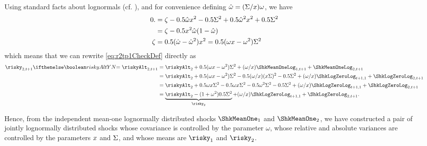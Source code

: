 Using standard facts about lognormals (cf. \MathFactsList), and for convenience
defining $\hat{\omega}= (\Sigma/x) \omega$, we have
\begin{equation}\begin{gathered}\begin{aligned}
  0. & =  \zeta - 0.5 \hat{\omega} x^{2} - 0.5 \Sigma^{2} + 0.5\hat{\omega}^{2}x^{2}+0.5  \Sigma^{2}
\\ & =  \zeta -0.5 x^{2} \hat{\omega}(1-\hat{\omega})
\\ \zeta & =  0.5 (\hat{\omega}-\hat{\omega}^{2}) x^{2} = 0.5 (\omega x-\omega^{2}) \Sigma^{2}
\end{aligned}\end{gathered}\end{equation}
which means that we can rewrite \eqref{eq:r2tp1CheckDef} directly as
\begin{equation*}\begin{gathered}\begin{aligned}
   \risky_{2,t+1} \ifriskyAlt{= \riskyAlt_{2,t+1}}{} & =  \riskyAlt_{2}+0.5 (\omega \scale-\omega^{2}) \sigAll^{2} + (\omega /\scale) \ShkMeanOneLog_{1,t+1} + \ShkMeanOneLog_{2,t+1}
\\ & =  \riskyAlt_{2}+0.5 (\omega \scale-\omega^{2}) \sigAll^{2} -0.5 (\omega/\scale)(\scale \sigAll)^2-0.5 \sigAll^{2}+(\omega /\scale) \ShkLogZeroLog_{t+1,1}  + \ShkLogZeroLog_{2,t+1}
\\ & =  \riskyAlt_{2}+0.5 \omega \scale \sigAll^{2} -0.5 \omega\scale \sigAll^2 - 0.5 \omega^{2} \sigAll^{2}-0.5 \sigAll^{2}+(\omega /\scale) \ShkLogZeroLog_{t+1,1}  + \ShkLogZeroLog_{2,t+1}
\\ & =  \underbrace{\riskyAlt_{2} - (1+\omega^{2})0.5 \sigAll^{2}}_{\risky_{2}}+(\omega /\scale) \ShkLogZeroLog_{t+1,1}  + \ShkLogZeroLog_{2,t+1}
.
\end{aligned}\end{gathered}\end{equation*}


Hence, from the independent mean-one lognormally distributed shocks
$\ShkMeanOne_{1}$ and $\ShkMeanOne_{2}$, we have constructed a pair of
jointly lognormally distributed shocks whose covariance is controlled
by the parameter $\omega$, whose relative and absolute variances are
controlled by the parameters $x$ and $\Sigma$, and whose means
are $\risky_{1}$ and $\risky_{2}$.

